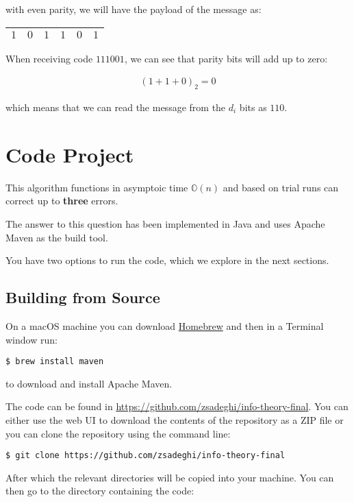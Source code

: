 \documentclass{article}
\newcommand{\shellprompt}[1]{{%
\vspace{0.3in}%
\hangindent=0.5in%
\small{\texttt{\$ #1}}%
\vspace{0.3in}%
}}
\begin{document}
with even parity, we will have the payload of the message as:

\begin{center}
  \begin{tabular}{|c|c|c|c|c|c|}
    \hline
    \cellcolor{YellowGreen} $1$ & \cellcolor{YellowGreen} $0$ & \cellcolor{GreenYellow} $1$ & \cellcolor{YellowGreen} $1$ & \cellcolor{GreenYellow} $0$ & \cellcolor{GreenYellow} $1$ \\
    \hline
  \end{tabular}
\end{center}

When receiving code $111001$, we can see that parity bits will add up to zero:

\begin{align*}
  (1 + 1 + 0)_2=0
\end{align*}

which means that we can read the message from the $d_i$ bits as $110$.

\section{Code Project}

This algorithm functions in asymptoic time $\mathbb{O}(n)$ and based on trial runs
can correct up to \textbf{three} errors.

The answer to this question has been implemented in Java and uses Apache Maven
as the build tool.

You have two options to run the code, which we explore in the next sections.

\subsection{Building from Source}

On a macOS machine you can download \href{http://brew.sh}{Homebrew} and then in a
Terminal window run:

\shellprompt{brew install maven}

to download and install Apache Maven.

The code can be found in \url{https://github.com/zsadeghi/info-theory-final}. You can
either use the web UI to download the contents of the repository as a ZIP file or you
can clone the repository using the command line:

\shellprompt{git clone https://github.com/zsadeghi/info-theory-final}

After which the relevant directories will be copied into your machine. You can then
go to the directory containing the code:
\end{document}
